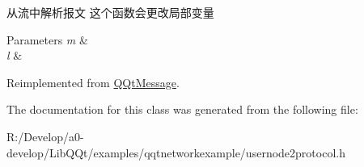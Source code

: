 从流中解析报文 这个函数会更改局部变量 


\begin{DoxyParams}{Parameters}
{\em m} & \\
\hline
{\em l} & \\
\hline
\end{DoxyParams}


Reimplemented from \mbox{\hyperlink{class_q_qt_message_a0bc25669bdd61490b1d8df6d77565f31}{Q\+Qt\+Message}}.



The documentation for this class was generated from the following file\+:\begin{DoxyCompactItemize}
\item 
R\+:/\+Develop/a0-\/develop/\+Lib\+Q\+Qt/examples/qqtnetworkexample/usernode2protocol.\+h\end{DoxyCompactItemize}

